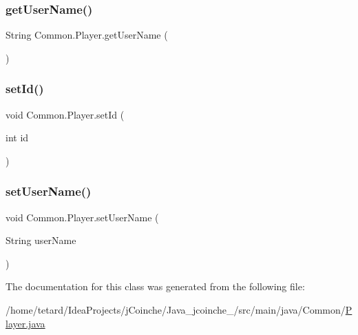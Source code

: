 \mbox{\label{classCommon_1_1Player_a0b71351bbbea5a4624cafc7a9046b227}} 
\subsubsection{\texorpdfstring{get\+User\+Name()}{getUserName()}}
{\footnotesize\ttfamily String Common.\+Player.\+get\+User\+Name (\begin{DoxyParamCaption}{ }\end{DoxyParamCaption})\hspace{0.3cm}{\ttfamily [inline]}}

\mbox{\label{classCommon_1_1Player_a400188d44456475d7864021917d9fe88}} 
\subsubsection{\texorpdfstring{set\+Id()}{setId()}}
{\footnotesize\ttfamily void Common.\+Player.\+set\+Id (\begin{DoxyParamCaption}\item[{int}]{id }\end{DoxyParamCaption})\hspace{0.3cm}{\ttfamily [inline]}}

\mbox{\label{classCommon_1_1Player_a89374a2bf8698d365493343ed49c7750}} 
\subsubsection{\texorpdfstring{set\+User\+Name()}{setUserName()}}
{\footnotesize\ttfamily void Common.\+Player.\+set\+User\+Name (\begin{DoxyParamCaption}\item[{String}]{user\+Name }\end{DoxyParamCaption})\hspace{0.3cm}{\ttfamily [inline]}}



The documentation for this class was generated from the following file\+:\begin{DoxyCompactItemize}
\item 
/home/tetard/\+Idea\+Projects/j\+Coinche/\+Java\+\_\+jcoinche\+\_/src/main/java/\+Common/\mbox{\hyperlink{Player_8java}{Player.\+java}}\end{DoxyCompactItemize}
